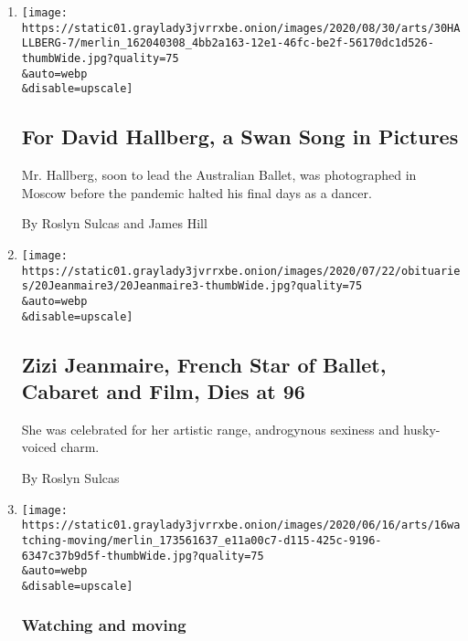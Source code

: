 \begin{enumerate}
\def\labelenumi{\arabic{enumi}.}
\item
  \href{/2020/08/28/arts/dance/david-hallberg-bolshoi.html}{}

  \texttt{[image: https://static01.graylady3jvrrxbe.onion/images/2020/08/30/arts/30HALLBERG-7/merlin\_162040308\_4bb2a163-12e1-46fc-be2f-56170dc1d526-thumbWide.jpg?quality=75\\\&auto=webp\\\&disable=upscale]}

  \hypertarget{for-david-hallberg-a-swan-song-in-pictures}{%
  \subsection{For David Hallberg, a Swan Song in
  Pictures}\label{for-david-hallberg-a-swan-song-in-pictures}}

  Mr. Hallberg, soon to lead the Australian Ballet, was photographed in
  Moscow before the pandemic halted his final days as a dancer.

  By Roslyn Sulcas and James Hill
\item
  \href{/2020/07/21/arts/dance/zizi-jeanmaire-french-star-of-ballet-cabaret-and-film-dies-at-96.html}{}

  \texttt{[image: https://static01.graylady3jvrrxbe.onion/images/2020/07/22/obituaries/20Jeanmaire3/20Jeanmaire3-thumbWide.jpg?quality=75\\\&auto=webp\\\&disable=upscale]}

  \hypertarget{zizi-jeanmaire-french-star-of-ballet-cabaret-and-film-dies-at-96}{%
  \subsection{Zizi Jeanmaire, French Star of Ballet, Cabaret and Film,
  Dies at
  96}\label{zizi-jeanmaire-french-star-of-ballet-cabaret-and-film-dies-at-96}}

  She was celebrated for her artistic range, androgynous sexiness and
  husky-voiced charm.

  By Roslyn Sulcas
\item
  \href{/2020/06/16/arts/dance/streaming-dance.html}{}

  \texttt{[image: https://static01.graylady3jvrrxbe.onion/images/2020/06/16/arts/16watching-moving/merlin\_173561637\_e11a00c7-d115-425c-9196-6347c37b9d5f-thumbWide.jpg?quality=75\\\&auto=webp\\\&disable=upscale]}

  \hypertarget{watching-and-moving}{%
  \subsubsection{Watching and moving}\label{watching-and-moving}}


\end{enumerate}
